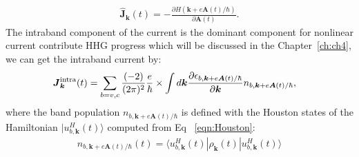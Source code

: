 \begin{align}
\hat{\boldsymbol J}_{\boldsymbol{k}}(t) = -\frac{\partial H(\boldsymbol{k}+e\boldsymbol{A}(t)/\hbar)}{\partial \boldsymbol A(t)}.
\label{totalcurrent}
\end{align}
The intraband component of the current is the dominant component for nonlinear current contribute
HHG progress which will be discussed in the Chapter~\ref{ch:ch4}, we can get the intraband current by:
\begin{align}
\boldsymbol{J}^{\mathrm{intra}}_{\boldsymbol k}(t)&=\sum_{b=v,c} \frac{(-2)}{(2\pi)^2}
\frac{e}{\hbar} \nonumber \times  
\int d\boldsymbol{k}\frac{\partial\epsilon_{b,\boldsymbol{k}+e\boldsymbol{A}(t)/\hbar}}{\partial\boldsymbol{k}} n_{b,\boldsymbol{k}+e\boldsymbol{A}(t)/\hbar},
\label{eqn:intra-steady-current}
\end{align}
where the band population $n_{b,\boldsymbol{k}+e\boldsymbol{A}(t)/\hbar}$ is defined with the Houston states of the Hamiltonian $|u^H_{b,\boldsymbol k} (t)\rangle$ computed from Eq ~\ref{eqn:Houston}:
\begin{align}
n_{b,\boldsymbol{k}+e\boldsymbol{A}(t)/\hbar}(t)=\langle u^H_{b,\boldsymbol k}(t) |\rho_{\boldsymbol{k}}(t)|u^H_{b,\boldsymbol k}(t) \rangle
\end{align}



